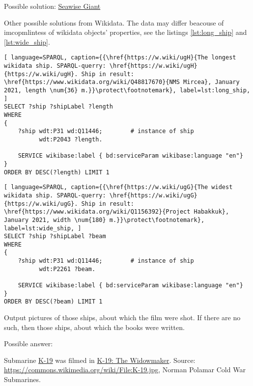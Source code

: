 Possible solution: \href{https://en.wikipedia.org/wiki/Seawise_Giant}{Seawise Giant}

Other possible solutions from Wikidata. The data may differ beacouse of imcopmlintess of wikidata objects' properties, see the listings \ref{lst:long_ship} and \ref{lst:wide_ship}.
\begin{lstlisting}[ language=SPARQL, caption={{\href{https://w.wiki/ugH}{The longest wikidata ship. SPARQL-querry: \href{https://w.wiki/ugH}{https://w.wiki/ugH}. Ship in result: \href{https://www.wikidata.org/wiki/Q48817670}{NMS Mircea}, January 2021, length \num{36} m.}}\protect\footnotemark}, label=lst:long_ship, ]
SELECT ?ship ?shipLabel ?length
WHERE
{
	?ship wdt:P31 wd:Q11446;        # instance of ship
		  wdt:P2043 ?length.
	  
	SERVICE wikibase:label { bd:serviceParam wikibase:language "en"}
}
ORDER BY DESC(?length) LIMIT 1
\end{lstlisting}

\begin{lstlisting}[ language=SPARQL, caption={{\href{https://w.wiki/ugG}{The widest wikidata ship. SPARQL-querry: \href{https://w.wiki/ugG}{https://w.wiki/ugG}. Ship in result: \href{https://www.wikidata.org/wiki/Q1156392}{Project Habakkuk}, January 2021, width \num{180} m.}}\protect\footnotemark}, label=lst:wide_ship, ]
SELECT ?ship ?shipLabel ?beam
WHERE
{
	?ship wdt:P31 wd:Q11446;        # instance of ship
		  wdt:P2261 ?beam.
	  
	SERVICE wikibase:label { bd:serviceParam wikibase:language "en"}
}
ORDER BY DESC(?beam) LIMIT 1
\end{lstlisting}


\begin{exercise}
	\label{answer:ship_ex_2}
	Output pictures of those ships, about which the film were shot. If there are no such, then those ships, about which the books were written.\\

\end{exercise}
Possible answer:\\
{
	\setlength{\fboxsep}{0pt}%
	\setlength{\fboxrule}{1pt}%
}

Submarine \href{https://en.wikipedia.org/wiki/Soviet_submarine_K-19}{K-19} was filmed in \href{https://en.wikipedia.org/wiki/K-19:_The_Widowmaker}{K-19: The Widowmaker}.  Source: \href{https://commons.wikimedia.org/wiki/File:K-19.jpg}{https://commons.wikimedia.org/wiki/File:K-19.jpg}, Norman Polamar Cold War Submarines.



